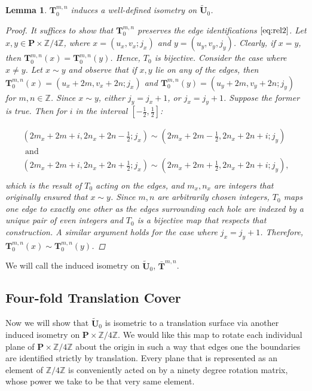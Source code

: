 \documentclass[]{article}
\newtheorem{lem}{Lemma}[subsection]
\begin{document}
\begin{lem}$\mathbf{T}^{m,n}_{0}$ induces a well-defined isometry on $\tilde{\mathbf{U}}_0$.
\begin{proof}
It suffices to show that $\mathbf{T}^{m,n}_{0}$ preserves the edge identifications $\eqref{eq:rel2}$. Let $x,y\in\mathbf{P}\times\mathbb{Z}/4\mathbb{Z}$, where $x=(u_x,v_x;j_x)$ and $y=(u_y,v_y,j_y)$. Clearly, if $x=y$, then $\mathbf{T}^{m,n}_{0}(x)=\mathbf{T}^{m,n}_{0}(y)$. Hence, $T_0$ is bijective. Consider the case where $x\neq y$. Let $x\sim y$ and observe that if $x,y$ lie on any of the edges, then $\mathbf{T}^{m,n}_{0}(x)=(u_x+2m,v_x+2n;j_x)$ and $\mathbf{T}^{m,n}_{0}(y)=(u_y+2m,v_y+2n;j_y)$ for $m,n\in\mathbb{Z}$. Since $x\sim y$, either $j_y=j_x+1$, or $j_x=j_y+1$. Suppose the former is true. Then for $i$ in the interval $[-\frac{1}{2},\frac{1}{2}]$:

\begin{equation*}
\begin{split}
(2m_x+2m+i, 2n_x+2n-\frac{1}{2};j_x)\sim(2m_x+2m-\frac{1}{2},2n_x+2n+i;j_y)\\\text{ and }\hspace{2in}\\
(2m_x+2m+i, 2n_x+2n+\frac{1}{2};j_x)\sim(2m_x+2m+\frac{1}{2},2n_x+2n+i;j_y),\\
\end{split}
\end{equation*}
which is the result of $T_0$ acting on the edges, and $m_x,n_x$ are integers that originally ensured that $x\sim y$. Since $m,n$ are arbitrarily chosen integers, $T_0$ maps one edge to exactly one other as the edges surrounding each hole are indexed by a unique pair of even integers and $T_0$  is a bijective map that respects that construction. A similar argument holds for the case where $j_x=j_y+1$. Therefore, $\mathbf{T}^{m,n}_{0}(x)\sim\mathbf{T}^{m,n}_{0}(y)$.
\end{proof}
\end{lem}

We will call the induced isometry on $\tilde{\mathbf{U}}_0$, $\bar{\mathbf{T}}^{m,n}$.

\subsection{Four-fold Translation Cover}

 Now we will show that $\tilde{\mathbf{U}}_0$ is isometric to a translation surface via another induced isometry on $\mathbf{P}\times\mathbb{Z}/4\mathbb{Z}$. We would like this map to rotate each individual plane of $\mathbf{P}\times\mathbb{Z}/4\mathbb{Z}$ about the origin in such a way that edges one the boundaries are identified strictly by translation. Every plane that is represented as an element of $\mathbb{Z}/4\mathbb{Z}$ is conveniently acted on by a ninety degree rotation matrix, whose power we take to be that very same element.
\end{document}
